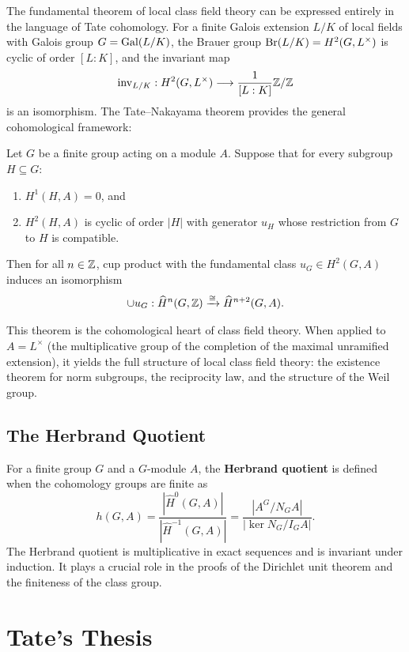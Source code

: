 The fundamental theorem of local class field theory can be expressed entirely in the language of Tate cohomology. For a finite Galois extension \(L/K\) of local fields with Galois group \(G = \operatorname{Gal}(L/K)\), the Brauer group \(\operatorname{Br}(L/K) = H^2(G, L^\times)\) is cyclic of order \([L:K]\), and the invariant map
\[
\operatorname{inv}_{L/K}: H^2(G, L^\times) \longrightarrow \frac{1}{[L:K]}\mathbb{Z}/\mathbb{Z}
\]
is an isomorphism. The Tate--Nakayama theorem provides the general cohomological framework:

\begin{theorem}
Let \(G\) be a finite group acting on a module \(A\). Suppose that for every subgroup \(H \subseteq G\):
\begin{enumerate}
    \item \(H^1(H, A) = 0\), and
    \item \(H^2(H, A)\) is cyclic of order \(|H|\) with generator \(u_H\) whose restriction from \(G\) to \(H\) is compatible.
\end{enumerate}
Then for all \(n \in \mathbb{Z}\), cup product with the fundamental class \(u_G \in H^2(G, A)\) induces an isomorphism
\[
\cup u_G: \widehat{H}^n(G, \mathbb{Z}) \xrightarrow{\cong} \widehat{H}^{n+2}(G, A).
\]
\end{theorem}

This theorem is the cohomological heart of class field theory. When applied to \(A = L^\times\) (the multiplicative group of the completion of the maximal unramified extension), it yields the full structure of local class field theory: the existence theorem for norm subgroups, the reciprocity law, and the structure of the Weil group.

\subsection{The Herbrand Quotient}

For a finite group \(G\) and a \(G\)-module \(A\), the \textbf{Herbrand quotient} is defined when the cohomology groups are finite as
\[
h(G,A) = \frac{|\widehat{H}^0(G,A)|}{|\widehat{H}^{-1}(G,A)|} = \frac{|A^G/N_GA|}{|\ker N_G / I_G A|}.
\]
The Herbrand quotient is multiplicative in exact sequences and is invariant under induction. It plays a crucial role in the proofs of the Dirichlet unit theorem and the finiteness of the class group.

\section{Tate's Thesis}

